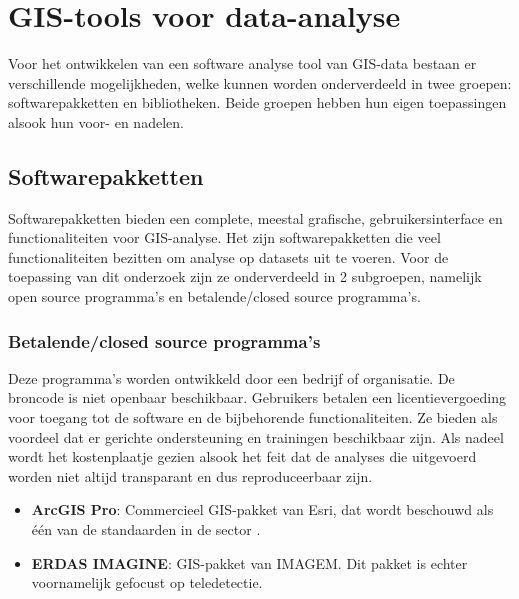 \section{GIS-tools voor data-analyse}\label{sec:GIS-tools}
Voor het ontwikkelen van een software analyse tool van GIS-data bestaan er verschillende mogelijkheden, welke kunnen worden onderverdeeld in twee groepen: softwarepakketten en bibliotheken. Beide groepen hebben hun eigen toepassingen alsook hun voor- en nadelen.\par

\subsection{Softwarepakketten}
Softwarepakketten bieden een complete, meestal grafische, gebruikersinterface en functionaliteiten voor GIS-analyse. Het zijn softwarepakketten die veel functionaliteiten bezitten om analyse op datasets uit te voeren. Voor de toepassing van dit onderzoek zijn ze onderverdeeld in 2 subgroepen, namelijk open source programma's en betalende/closed source programma's.

\subsubsection{Betalende/closed source programma's}
Deze programma's worden ontwikkeld door een bedrijf of organisatie. De broncode is niet openbaar beschikbaar. Gebruikers betalen een licentievergoeding voor toegang tot de software en de bijbehorende functionaliteiten. Ze bieden als voordeel dat er gerichte ondersteuning en trainingen beschikbaar zijn. Als nadeel wordt het kostenplaatje gezien alsook het feit dat de analyses die uitgevoerd worden niet altijd transparant en dus reproduceerbaar zijn.

\begin{itemize}
    \item \textbf{ArcGIS Pro}: Commercieel GIS-pakket van Esri, dat wordt beschouwd als één van de standaarden in de sector \autocite{Trends2026}.
    \item \textbf{ERDAS IMAGINE}: GIS-pakket van IMAGEM. Dit pakket is echter voornamelijk gefocust op teledetectie.
\end{itemize}

